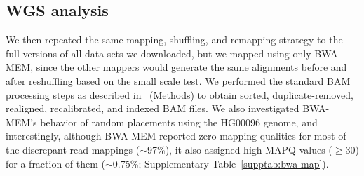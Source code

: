 \documentclass{bioinfo}
\begin{document}
\begin{methods}
\subsection*{WGS analysis}
We then repeated the same mapping, shuffling, and remapping strategy to the full versions of all data sets we downloaded, but we mapped using only BWA-MEM, since the other mappers 
would generate the same alignments before and after reshuffling based on the small scale test. We performed the standard BAM processing steps as described 
in~\citep{VanderAuwera2013} (Methods) to obtain sorted, duplicate-removed, realigned, recalibrated, and indexed BAM files. We also investigated BWA-MEM's behavior of random placements using the
HG00096 genome, and interestingly, although BWA-MEM reported zero mapping qualities for 
most of the discrepant read mappings ($\sim$97\%), it also assigned high MAPQ values ($\geq$30) for a fraction of them  ($\sim$0.75\%; Supplementary Table~\ref{supptab:bwa-map}). 




\end{methods}
\end{document}
